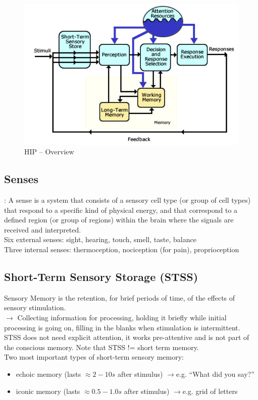 \begin{figure}[h!]
	\centering
	\includegraphics[width=.5\textwidth]{img/ch03_hip_overview}
	\caption{HIP -- Overview}
	\label{hip}
\end{figure} 


\subsection{Senses}:
A sense is a system that consists of a sensory cell type (or group of cell types) that respond to a specific kind of physical energy, and that correspond to a defined region (or group of regions) within the brain where the signals are received and interpreted.\\
Six external senses: sight, hearing, touch, smell, taste, balance\\
Three internal senses: thermoception, nociception (for pain), proprioception 

\subsection{Short-Term Sensory Storage (STSS)}
Sensory Memory is the retention, for brief periods of time, of the effects of sensory stimulation.\\
$\rightarrow$ Collecting information for processing, holding it briefly while initial processing is going on, filling in the blanks when stimulation is intermittent.\\
STSS does not need explicit attention, it works pre-attentive and is not part of the conscious memory. Note that STSS != short term memory.\\
Two most important types of short-term sensory memory:
\begin{itemize}
\item echoic memory (lasts $\approx 2-10s$ after stimulus) $\rightarrow$e.g. ``What did you say?''
\item iconic memory (lasts $\approx 0.5-1.0s$ after stimulus) $\rightarrow$e.g. grid of letters
\end{itemize}

